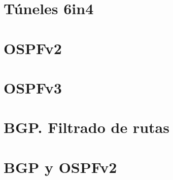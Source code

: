 \documentclass{article}
\begin{document}
\tableofcontents

\section{Túneles 6in4}
  

\section{OSPFv2}

  

\newpage
\section{OSPFv3}
  
\newpage

\section{BGP. Filtrado de rutas}

  

\section{BGP y OSPFv2}

  
\end{document}
